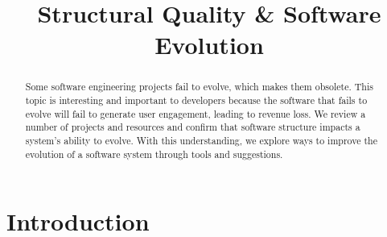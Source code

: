 \documentclass[12pt,conference]{IEEEtran}
\begin{document}
\pagestyle{plain}

\title{Structural Quality \& Software Evolution}

\author{
}

\maketitle

\begin{abstract}

Some software engineering projects fail to evolve, which makes them obsolete.
This topic is interesting and important to developers because the software that fails to evolve will fail to generate user engagement, leading to revenue loss.
We review a number of projects and resources and confirm that software structure impacts a system's ability to evolve.
With this understanding, we explore ways to improve the evolution of a software system through tools and suggestions.

\end{abstract}


\vspace{0.5cm}
\section{Introduction}
\vspace{0.25cm}
\end{document}
